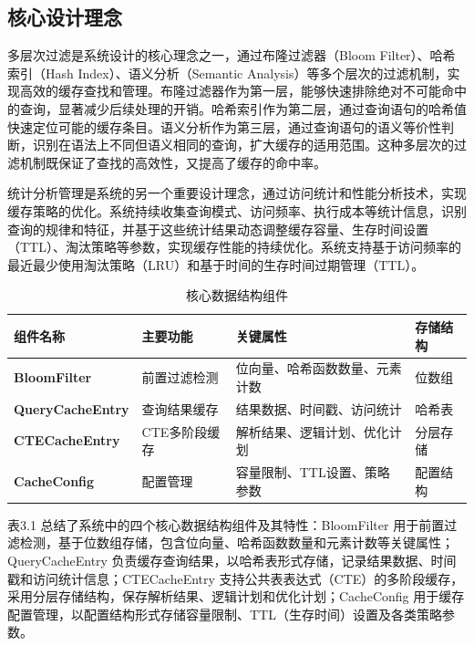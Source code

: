 \subsection{核心设计理念}

多层次过滤是系统设计的核心理念之一，通过布隆过滤器（Bloom Filter）、哈希索引（Hash Index）、语义分析（Semantic Analysis）等多个层次的过滤机制，实现高效的缓存查找和管理。布隆过滤器作为第一层，能够快速排除绝对不可能命中的查询，显著减少后续处理的开销。哈希索引作为第二层，通过查询语句的哈希值快速定位可能的缓存条目。语义分析作为第三层，通过查询语句的语义等价性判断，识别在语法上不同但语义相同的查询，扩大缓存的适用范围。这种多层次的过滤机制既保证了查找的高效性，又提高了缓存的命中率。





统计分析管理是系统的另一个重要设计理念，通过访问统计和性能分析技术，实现缓存策略的优化。系统持续收集查询模式、访问频率、执行成本等统计信息，识别查询的规律和特征，并基于这些统计结果动态调整缓存容量、生存时间设置（TTL）、淘汰策略等参数，实现缓存性能的持续优化。系统支持基于访问频率的最近最少使用淘汰策略（LRU）和基于时间的生存时间过期管理（TTL）。

\begin{table}[htbp]
    \caption{核心数据结构组件}
    \label{table3_1}
    \centering
    \begin{tabular}{p{3cm}p{3cm}p{4cm}p{2cm}}
        \hline
        组件名称 & 主要功能 & 关键属性 & 存储结构 \\
        \hline
        \textbf{BloomFilter} & 前置过滤检测 & 位向量、哈希函数数量、元素计数 & 位数组 \\
        \textbf{QueryCacheEntry} & 查询结果缓存 & 结果数据、时间戳、访问统计 & 哈希表 \\
        \textbf{CTECacheEntry} & CTE多阶段缓存 & 解析结果、逻辑计划、优化计划 & 分层存储 \\
        \textbf{CacheConfig} & 配置管理 & 容量限制、TTL设置、策略参数 & 配置结构 \\
        \hline
    \end{tabular}
\end{table}

表3.1 总结了系统中的四个核心数据结构组件及其特性：BloomFilter 用于前置过滤检测，基于位数组存储，包含位向量、哈希函数数量和元素计数等关键属性；QueryCacheEntry 负责缓存查询结果，以哈希表形式存储，记录结果数据、时间戳和访问统计信息；CTECacheEntry 支持公共表表达式（CTE）的多阶段缓存，采用分层存储结构，保存解析结果、逻辑计划和优化计划；CacheConfig 用于缓存配置管理，以配置结构形式存储容量限制、TTL（生存时间）设置及各类策略参数。

